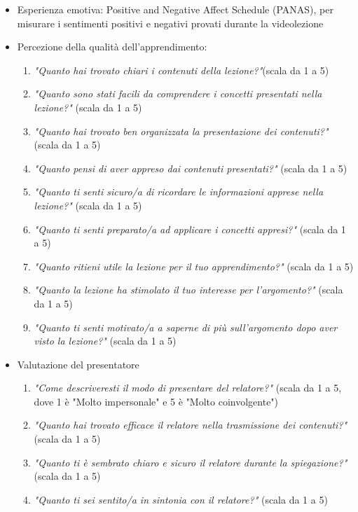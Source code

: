 \begin{itemize}
    \item Esperienza emotiva: Positive and Negative Affect Schedule (PANAS), per misurare i sentimenti positivi e negativi provati durante la videolezione
    \item Percezione della qualità dell’apprendimento:
        \begin{enumerate}
            \item \textit{"Quanto hai trovato chiari i contenuti della lezione?"}(scala da 1 a 5)
            \item \textit{"Quanto sono stati facili da comprendere i concetti presentati nella lezione?"} (scala da 1 a 5)
            \item \textit{"Quanto hai trovato ben organizzata la presentazione dei contenuti?"} (scala da 1 a 5)
            \item \textit{"Quanto pensi di aver appreso dai contenuti presentati?"} (scala da 1 a 5)
            \item \textit{"Quanto ti senti sicuro/a di ricordare le informazioni apprese nella lezione?"} (scala da 1 a 5)
            \item \textit{"Quanto ti senti preparato/a ad applicare i concetti appresi?"} (scala da 1 a 5)
            \item \textit{"Quanto ritieni utile la lezione per il tuo apprendimento?"} (scala da 1 a 5)
            \item \textit{"Quanto la lezione ha stimolato il tuo interesse per l’argomento?"} (scala da 1 a 5)
            \item \textit{"Quanto ti senti motivato/a a saperne di più sull’argomento dopo aver visto la lezione?"} (scala da 1 a 5)
        \end{enumerate}
    \item Valutazione del presentatore
        \begin{enumerate}
            \item \textit{"Come descriveresti il modo di presentare del relatore?"} (scala da 1 a 5, dove 1 è "Molto impersonale" e 5 è "Molto coinvolgente")
            \item \textit{"Quanto hai trovato efficace il relatore nella trasmissione dei contenuti?"} (scala da 1 a 5)
            \item \textit{"Quanto ti è sembrato chiaro e sicuro il relatore durante la spiegazione?"} (scala da 1 a 5)
            \item \textit{"Quanto ti sei sentito/a in sintonia con il relatore?"} (scala da 1 a 5)

\end{enumerate}
\end{itemize}
